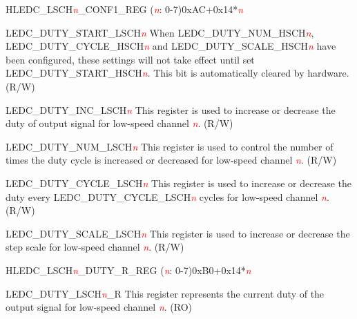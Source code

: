 \begin{register}{H}{LEDC\_LSCH\textcolor{red}{\it{n}}\_CONF1\_REG (\textcolor{red}{\it{n}}: 0-7)}{0xAC+0x14*\textcolor{red}{\it{n}}}\label{regdesc:LEDCLSCHnCONF1REG}
%
%
%
%
%
\regnewline%
\begin{regdesc}\begin{reglist}
\item [LEDC\_DUTY\_START\_LSCH\textcolor{red}{\it{n}}]When LEDC\_DUTY\_NUM\_HSCH\textcolor{red}{\it{n}}, LEDC\_DUTY\_CYCLE\_HSCH\textcolor{red}{\it{n}} and LEDC\_DUTY\_SCALE\_HSCH\textcolor{red}{\it{n}} have been configured, these settings will not take effect until set LEDC\_DUTY\_START\_HSCH\textcolor{red}{\it{n}}. This bit is automatically cleared by hardware. (R/W)
\item [LEDC\_DUTY\_INC\_LSCH\textcolor{red}{\it{n}}]This register is used to increase or decrease the duty of output signal for low-speed channel \textcolor{red}{\it{n}}. (R/W)
\item [LEDC\_DUTY\_NUM\_LSCH\textcolor{red}{\it{n}}]This register is used to control the number of times the duty cycle is increased or decreased for low-speed channel \textcolor{red}{\it{n}}. (R/W)
\item [LEDC\_DUTY\_CYCLE\_LSCH\textcolor{red}{\it{n}}]This register is used to increase or decrease the duty every LEDC\_DUTY\_CYCLE\_LSCH\textcolor{red}{\it{n}} cycles for low-speed channel \textcolor{red}{\it{n}}. (R/W)
\item [LEDC\_DUTY\_SCALE\_LSCH\textcolor{red}{\it{n}}]This register is used to increase or decrease the step scale for low-speed channel \textcolor{red}{\it{n}}. (R/W)
\end{reglist}\end{regdesc}
\end{register}


\begin{register}{H}{LEDC\_LSCH\textcolor{red}{\it{n}}\_DUTY\_R\_REG (\textcolor{red}{\it{n}}: 0-7)}{0xB0+0x14*\textcolor{red}{\it{n}}}\label{regdesc:LEDCLSCHnDUTYRREG}
%
%
\regnewline%
\begin{regdesc}\begin{reglist}
\item [LEDC\_DUTY\_LSCH\textcolor{red}{\it{n}}\_R]This register represents the current duty of the output signal for low-speed channel \textcolor{red}{\it{n}}. (RO)
\end{reglist}\end{regdesc}
\end{register}


